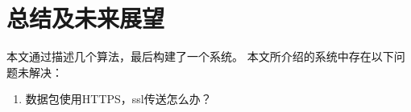 \chapter{总结及未来展望}
本文通过描述几个算法，最后构建了一个系统。
本文所介绍的系统中存在以下问题未解决：
\begin{enumerate}
 \item 数据包使用HTTPS，ssl传送怎么办？
\end{enumerate}